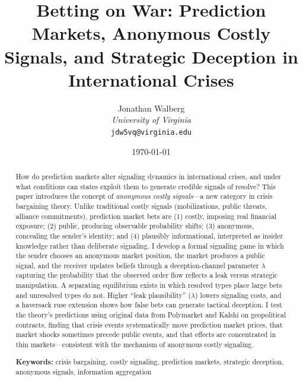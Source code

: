 \documentclass[12pt]{article}
\begin{document}
\title{Betting on War: Prediction Markets, Anonymous Costly Signals, and Strategic Deception in International Crises}

\author{%
Jonathan Walberg\\
\textit{University of Virginia}\\
\texttt{jdw5vq@virginia.edu}
}

\date{\today}

\maketitle

\begin{abstract}
How do prediction markets alter signaling dynamics in international crises, and under what conditions can states exploit them to generate credible signals of resolve? This paper introduces the concept of \textit{anonymous costly signals}---a new category in crisis bargaining theory. Unlike traditional costly signals (mobilizations, public threats, alliance commitments), prediction market bets are (1) costly, imposing real financial exposure; (2) public, producing observable probability shifts; (3) anonymous, concealing the sender's identity; and (4) plausibly informational, interpreted as insider knowledge rather than deliberate signaling. I develop a formal signaling game in which the sender chooses an anonymous market position, the market produces a public signal, and the receiver updates beliefs through a deception-channel parameter $\lambda$ capturing the probability that the observed order flow reflects a leak versus strategic manipulation. A separating equilibrium exists in which resolved types place large bets and unresolved types do not. Higher ``leak plausibility'' ($\lambda$) lowers signaling costs, and a haversack ruse extension shows how false bets can generate tactical deception. I test the theory's predictions using original data from Polymarket and Kalshi on geopolitical contracts, finding that crisis events systematically move prediction market prices, that market shocks sometimes precede public events, and that effects are concentrated in thin markets---consistent with the mechanism of anonymous costly signaling.

\vspace{0.5em}
\noindent\textbf{Keywords:} crisis bargaining, costly signaling, prediction markets, strategic deception, anonymous signals, information aggregation
\end{abstract}

\newpage
\tableofcontents
\newpage
\end{document}
